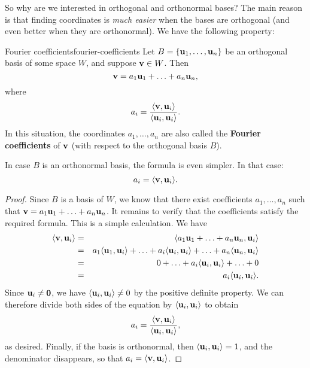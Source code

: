 So why are we interested in orthogonal and orthonormal bases? The main
reason is that finding coordinates is {\em much easier} when the bases
are orthogonal (and even better when they are orthonormal). We have
the following property:

\begin{proposition}{Fourier coefficients}{fourier-coefficients}
  Let $B=\set{\vect{u}_1,\ldots,\vect{u}_n}$ be an orthogonal basis of
  some space $W$, and suppose $\vect{v}\in W$. Then
  \begin{equation*}
    \vect{v} = a_1\vect{u}_1 + \ldots + a_n\vect{u}_n,
  \end{equation*}
  where
  \begin{equation*}
    a_i = \frac{\iprod{\vect{v},\vect{u}_i}}{\iprod{\vect{u}_i,\vect{u}_i}}.
  \end{equation*}
  In this situation, the coordinates $a_1,\ldots,a_n$ are also called
  the \textbf{Fourier coefficients}%
   of $\vect{v}$ (with respect to the
  orthogonal basis $B$).
  \smallskip\smallskip

  In case $B$ is an orthonormal basis, the formula is even simpler. In
  that case:
    \begin{equation*}
    a_i = \iprod{\vect{v},\vect{u}_i}.
  \end{equation*}
\end{proposition}

\begin{proof}
  Since $B$ is a basis of $W$, we know that there exist coefficients
  $a_1,\ldots,a_n$ such that
  $\vect{v} = a_1\vect{u}_1 + \ldots + a_n\vect{u}_n$. It remains to
  verify that the coefficients satisfy the required formula. This is a
  simple calculation. We have
  \begin{eqnarray*}
    \iprod{\vect{v},\vect{u}_i}
    &=& \iprod{a_1\vect{u}_1 + \ldots + a_n\vect{u}_n, \vect{u}_i} \\
    &=& a_1\iprod{\vect{u}_1,\vect{u}_i}
        + \ldots
        + a_i\iprod{\vect{u}_i,\vect{u}_i}
        + \ldots
        + a_n\iprod{\vect{u}_n,\vect{u}_i} \\
    &=& 0
        + \ldots
        + a_i\iprod{\vect{u}_i,\vect{u}_i}
        + \ldots
        + 0 \\
    &=& a_i \iprod{\vect{u}_i,\vect{u}_i}.
  \end{eqnarray*}
  Since $\vect{u}_i\neq \vect{0}$, we have
  $\iprod{\vect{u}_i,\vect{u}_i}\neq 0$ by the positive definite
  property. We can therefore divide both sides of the equation by
  $\iprod{\vect{u}_i,\vect{u}_i}$ to obtain
  \begin{equation*}
    a_i = \frac{\iprod{\vect{v},\vect{u}_i}}{\iprod{\vect{u}_i,\vect{u}_i}},
  \end{equation*}
  as desired. Finally, if the basis is orthonormal, then
  $\iprod{\vect{u}_i,\vect{u}_i}=1$, and the denominator disappears,
  so that $a_i = \iprod{\vect{v},\vect{u}_i}$.
\end{proof}

